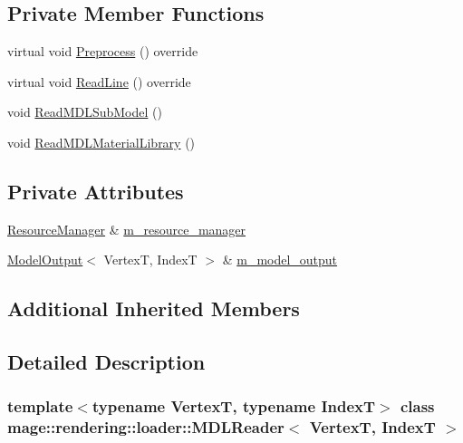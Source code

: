 \subsection*{Private Member Functions}
\begin{DoxyCompactItemize}
\item 
virtual void \mbox{\hyperlink{classmage_1_1rendering_1_1loader_1_1_m_d_l_reader_a397f0c0eedc56c983fc3a7074aa4e577}{Preprocess}} () override
\item 
virtual void \mbox{\hyperlink{classmage_1_1rendering_1_1loader_1_1_m_d_l_reader_a8b138830bd4ac4176b7a7444cdbdebfa}{Read\+Line}} () override
\item 
void \mbox{\hyperlink{classmage_1_1rendering_1_1loader_1_1_m_d_l_reader_afe15d41185ac5f4de6607561d7068d8c}{Read\+M\+D\+L\+Sub\+Model}} ()
\item 
void \mbox{\hyperlink{classmage_1_1rendering_1_1loader_1_1_m_d_l_reader_a40697c5c645e00ba6f4cc5cd28872b8f}{Read\+M\+D\+L\+Material\+Library}} ()
\end{DoxyCompactItemize}
\subsection*{Private Attributes}
\begin{DoxyCompactItemize}
\item 
\mbox{\hyperlink{classmage_1_1rendering_1_1_resource_manager}{Resource\+Manager}} \& \mbox{\hyperlink{classmage_1_1rendering_1_1loader_1_1_m_d_l_reader_ae1a276e89104344daa25666e4b074643}{m\+\_\+resource\+\_\+manager}}
\item 
\mbox{\hyperlink{structmage_1_1rendering_1_1_model_output}{Model\+Output}}$<$ VertexT, IndexT $>$ \& \mbox{\hyperlink{classmage_1_1rendering_1_1loader_1_1_m_d_l_reader_aab6301fae258aaea1619856000a29e53}{m\+\_\+model\+\_\+output}}
\end{DoxyCompactItemize}
\subsection*{Additional Inherited Members}


\subsection{Detailed Description}
\subsubsection*{template$<$typename VertexT, typename IndexT$>$\newline
class mage\+::rendering\+::loader\+::\+M\+D\+L\+Reader$<$ Vertex\+T, Index\+T $>$}


